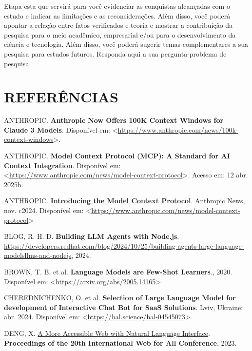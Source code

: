 \documentclass[
]{article}
\newlength{\cslhangindent}
\newenvironment{CSLReferences}[2] %
 {\begin{list}{}{%
  \setlength{\itemindent}{0pt}
  \setlength{\leftmargin}{0pt}
  \setlength{\parsep}{0pt}
  \ifodd #1
   \setlength{\leftmargin}{\cslhangindent}
   \setlength{\itemindent}{-1\cslhangindent}
  \fi
  \setlength{\itemsep}{#2\baselineskip}}}
 {\end{list}}
\begin{document}
Etapa esta que servirá para você evidenciar as conquistas alcançadas com
o estudo e indicar as limitações e as reconsiderações. Além disso, você
poderá apontar a relação entre fatos verificados e teoria e mostrar a
contribuição da pesquisa para o meio acadêmico, empresarial e/ou para o
desenvolvimento da ciência e tecnologia. Além disso, você poderá sugerir
temas complementares a sua pesquisa para estudos futuros. Responda aqui
a sua pergunta-problema de pesquisa.

\section*{REFERÊNCIAS}\label{referuxeancias}

\label{refs}
\begin{CSLReferences}{0}{1}
ANTHROPIC. \textbf{Anthropic Now Offers 100K Context Windows for Claude
3 Models}. Disponível em:
\textless{}\url{https://www.anthropic.com/news/100k-context-windows}\textgreater.

ANTHROPIC. \textbf{Model Context Protocol (MCP): A Standard for AI
Context Integration}. Disponível em:
\textless{}\url{https://www.anthropic.com/news/model-context-protocol}\textgreater.
Acesso em: 12 abr. 2025b.

ANTHROPIC. \textbf{{Introducing the Model Context Protocol}}. Anthropic
News, nov. c2024. Disponível em:
\textless{}\url{https://www.anthropic.com/news/model-context-protocol}\textgreater{}

BLOG, R. H. D. \textbf{Building LLM Agents with Node.js}.
\url{https://developers.redhat.com/blog/2024/10/25/building-agents-large-language-modelsllms-and-nodejs},
2024.

BROWN, T. B. et al. \textbf{Language Models are Few-Shot Learners}.,
2020. Disponível em:
\textless{}\url{https://arxiv.org/abs/2005.14165}\textgreater{}

CHEREDNICHENKO, O. et al. \textbf{Selection of Large Language Model for
development of Interactive Chat Bot for SaaS Solutions}. Lviv, Ukraine:
abr. 2024. Disponível em:
\textless{}\url{https://hal.science/hal-04545073}\textgreater{}

DENG, X. \href{https://api.semanticscholar.org/CorpusID:258259387}{A
More Accessible Web with Natural Language Interface}.
\textbf{Proceedings of the 20th International Web for All Conference},
2023.


\end{CSLReferences}
\end{document}
